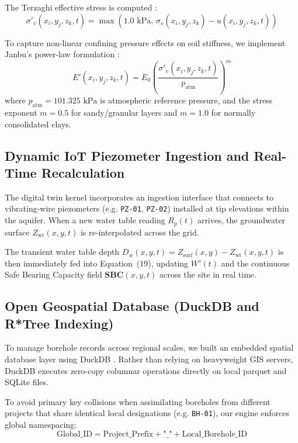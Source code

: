 \documentclass[11pt,a4paper]{article}
\begin{document}
The Terzaghi effective stress is computed \cite{terzaghi1943theoretical}:
\begin{equation}
\sigma'_v(x_i, y_j, z_k, t) = \max\left(1.0\text{ kPa}, \, \sigma_v(x_i, y_j, z_k) - u(x_i, y_j, z_k, t)\right)
\end{equation}

To capture non-linear confining pressure effects on soil stiffness, we implement Janbu's power-law formulation \cite{janbu1963soil}:
\begin{equation}
E'(x_i, y_j, z_k, t) = E_0 \left(\frac{\sigma'_v(x_i, y_j, z_k, t)}{p_{\text{atm}}}\right)^m
\end{equation}
where $p_{\text{atm}} = 101.325\text{ kPa}$ is atmospheric reference pressure, and the stress exponent $m = 0.5$ for sandy/granular layers and $m = 1.0$ for normally consolidated clays.

\subsection{Dynamic IoT Piezometer Ingestion and Real-Time Recalculation}

The digital twin kernel incorporates an ingestion interface that connects to vibrating-wire piezometers (e.g. \texttt{PZ-01}, \texttt{PZ-02}) installed at tip elevations within the aquifer. When a new water table reading $R_p(t)$ arrives, the groundwater surface $Z_{\text{wt}}(x, y, t)$ is re-interpolated across the grid.

The transient water table depth $D_w(x, y, t) = Z_{\text{surf}}(x, y) - Z_{\text{wt}}(x, y, t)$ is then immediately fed into Equation~(19), updating $W'(t)$ and the continuous Safe Bearing Capacity field $\mathbf{SBC}(x, y, t)$ across the site in real time.

\subsection{Open Geospatial Database (DuckDB and R*Tree Indexing)}

To manage borehole records across regional scales, we built an embedded spatial database layer using DuckDB \cite{raes2022duckdb}. Rather than relying on heavyweight GIS servers, DuckDB executes zero-copy columnar operations directly on local parquet and SQLite files.

To avoid primary key collisions when assimilating boreholes from different projects that share identical local designations (e.g. \texttt{BH-01}), our engine enforces global namespacing:
\begin{equation}
\text{Global\_ID} = \text{Project\_Prefix} + \text{"\_"} + \text{Local\_Borehole\_ID}
\end{equation}
\end{document}
